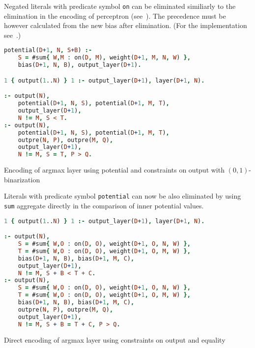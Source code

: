 Negated literals with predicate symbol \texttt{on} can be eliminated similiarly
to the elimination in the encoding of perceptron (see~). The precedence must be however
calculated from the new bias after elimination.
(For the implementation see~.)%
\label{sec:01-argmax}

\begin{code}
\begin{lstlisting}[language=Prolog, numbers=none]
potential(D+1, N, S+B) :-
    S = #sum{ W,M : on(D, M), weight(D+1, M, N, W) },
    bias(D+1, N, B), output_layer(D+1).

1 { output(1..N) } 1 :- output_layer(D+1), layer(D+1, N).

:- output(N),
    potential(D+1, N, S), potential(D+1, M, T),
    output_layer(D+1),
    N != M, S < T.
:- output(N),
    potential(D+1, N, S), potential(D+1, M, T),
    outpre(N, P), outpre(M, Q),
    output_layer(D+1),
    N != M, S = T, P > Q.
\end{lstlisting}
    \caption{Encoding of argmax layer using potential and constraints on output with $(0,1)$-binarization}\label{enc:argmax_potential_01}
\end{code}

Literals with predicate symbol \texttt{potential} can now be also eliminated
by using \texttt{sum} aggregate directly in the comparison of inner potential values.

\begin{code}
\begin{lstlisting}[language=Prolog, numbers=none]
1 { output(1..N) } 1 :- output_layer(D+1), layer(D+1, N).

:- output(N),
    S = #sum{ W,O : on(D, O), weight(D+1, O, N, W) },
    T = #sum{ W,O : on(D, O), weight(D+1, O, M, W) },
    bias(D+1, N, B), bias(D+1, M, C),
    output_layer(D+1),
    N != M, S + B < T + C.
:- output(N),
    S = #sum{ W,O : on(D, O), weight(D+1, O, N, W) },
    T = #sum{ W,O : on(D, O), weight(D+1, O, M, W) },
    bias(D+1, N, B), bias(D+1, M, C),
    outpre(N, P), outpre(M, Q),
    output_layer(D+1),
    N != M, S + B = T + C, P > Q.
\end{lstlisting}
    \caption{Direct encoding of argmax layer using constraints on output and equality}\label{enc:argmax_variable}
\end{code}

